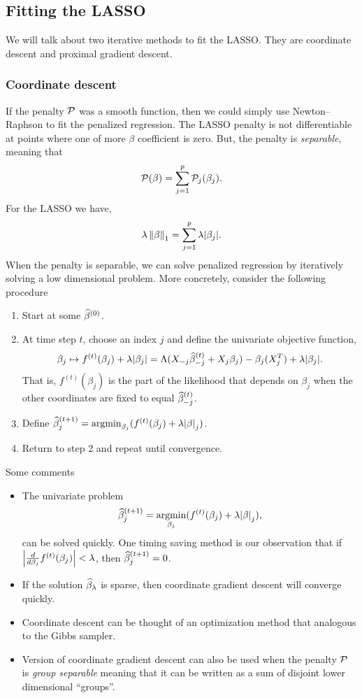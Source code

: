 \subsection{Fitting the LASSO}
We will talk about two iterative methods to fit the LASSO. They are coordinate descent and proximal gradient descent.
\subsubsection{Coordinate descent}
If the penalty ${\mathcal{P}}$ was a smooth function, then we could simply use Newton--Raphson to fit the penalized regression. The LASSO penalty is not differentiable at points where one of more $\beta$ coefficient is zero. But, the penalty is \emph{separable}, meaning that 
\[{\mathcal{P}}(\beta) = \sum_{j=1}^p {\mathcal{P}}_j(\beta_j). \]
For the LASSO we have,
\[\lambda \left\|\beta\right\|_1 = \sum_{j=1}^p \lambda {\left\lvert\beta_j\right\rvert}. \]
When the penalty is separable, we can solve penalized regression by iteratively solving a low dimensional problem. More concretely, consider the following procedure
\begin{enumerate}
    \item Start at some $\widehat{\beta}^{(0)}$.
    \item At time step $t$, choose an index $j$ and define the univariate objective function,
    \[\beta_j \mapsto f^{(t)}(\beta_j)+\lambda{\left\lvert\beta_j\right\rvert} = \Lambda(X_{-j}\widehat{\beta}_{-j}^{(t)}+X_j\beta_j) -\beta_j(X_j^T)+\lambda {\left\lvert\beta_j\right\rvert}. \]
    That is, $f^{(t)}(\beta_j)$ is the part of the likelihood that depends on $\beta_j$ when the other coordinates are fixed to equal $\widehat{\beta}^{(t)}_{-j}$.
    \item Define $\widehat{\beta}^{(t+1)}_j = \operatorname*{argmin}_{\beta_j}(f^{(t)}(\beta_j)+\lambda{\left\lvert\beta\right\rvert}_j)$.
    \item Return to step 2 and repeat until convergence.
\end{enumerate}
Some comments
\begin{itemize}
    \item The univariate problem 
    \[ \widehat{\beta}^{(t+1)}_j = \operatorname*{argmin}_{\beta_j}(f^{(t)}(\beta_j)+\lambda{\left\lvert\beta\right\rvert}_j),\]
    can be solved quickly. One timing saving method is our observation that if ${\left\lvert\frac{d}{d\beta_j}f^{(t)}(\beta_j)\right\rvert} < \lambda$, then $\widehat{\beta}^{(t+1)}_j = 0$.
    \item  If the solution $\widehat{\beta}_\lambda$ is sparse,  then coordinate gradient descent will converge quickly.
    \item Coordinate descent can be thought of an optimization method that analogous to the Gibbs sampler.
    \item Version of coordinate gradient descent can also be used when the penalty ${\mathcal{P}}$ is \emph{group separable} meaning that it can be written as a sum of disjoint lower dimensional ``groups''. 
\end{itemize}  
